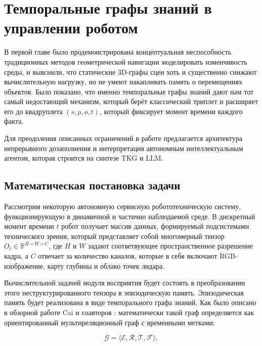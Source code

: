 \chapter{Темпоральные графы знаний в управлении роботом}
\label{ch:tkg}

В первой главе было продемонстрирована концептуальная неспособность традиционных методов геометрической навигации моделировать изменчивость среды, и выяснили, что статические 3D-графы сцен \cite{ref10} хоть и существенно снижают вычислительную нагрузку, но не умеют накапливать память о перемещениях объектов. Было показано, что именно темпоральные графы знаний \cite{ref40} дают нам тот самый недостающий механизм, который берёт классический триплет и расширяет его до квадруплета $\displaystyle (s, p, o, t)$, который фиксирует момент времени каждого факта.

Для преодоления описанных ограничений в работе предлагается архитектура непрерывного дозаполнения и интерпретация автономным интеллектуальным агентом, которая строится на синтезе TKG и LLM. 

\section{Математическая постановка задачи}
\label{sec:math_formulation}

Рассмотрим некоторую автономную сервисную робототехническую систему, функционирующую в динамичной и частично наблюдаемой среде. В дискретный момент времени $\displaystyle t$ робот получает массив данных, формируемый подсистемами технического зрения, который представляет собой многомерный тензор $\displaystyle O_t \in \mathbb{R}^{H \times W \times C}$, где $\displaystyle H$ и $\displaystyle W$ задают соответвующее пространственное разрешение кадра, а $\displaystyle C$ отвечает за количество каналов, которые в себя включают RGB-изображение, карту глубины и облако точек лидара.

Вычислительной задачей модуля восприятия будет состоять в преобразовании этого неструктурированного тензора в эпизодическую память. Эпизодическая память будет реализована в виде темпорального графа знаний. Как было описано в обзорной работе Cai и соавторов \cite{ref40}: математически такой граф определяется как ориентированный мультиреляционный граф с временными метками:

\begin{equation}
    \mathcal{G} = \langle \mathcal{E}, \mathcal{R}, \mathcal{T}, \mathcal{F} \rangle,
    \label{eq:tkg_def}
\end{equation}

